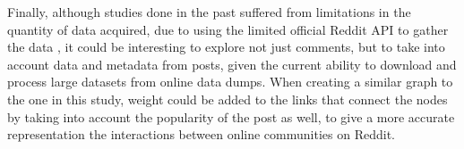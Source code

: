 \documentclass[bsc,frontabs,twoside,singlespacing,parskip,deptreport]{infthesis}
\begin{document}
Finally, although studies done in the past suffered from limitations in the quantity of data acquired, due to using the limited official Reddit API to gather the data \cite{weninger}, it could be interesting to explore not just comments, but to take into account data and metadata from posts, given the current ability to download and process large datasets from online data dumps. When creating a similar graph to the one in this study, weight could be added to the links that connect the nodes by taking into account the popularity of the post as well, to give a more accurate representation the interactions between online communities on Reddit. 

\nocite{*}



\end{document}

